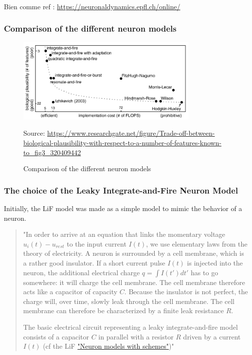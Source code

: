 \documentclass[11pt]{article}
\begin{document}
Bien comme ref : \url{https://neuronaldynamics.epfl.ch/online/}

\subsubsection{Comparison of the different neuron models}

\begin{figure}[H]
  \begin{center}
    \includegraphics[width=0.8\textwidth]{./image/comparison_neuron.png}
    \caption{Comparison of the different neuron models}
    \label{fig:comparison_neuron}
    Source: \url{https://www.researchgate.net/figure/Trade-off-between-biological-plausibility-with-respect-to-a-number-of-features-known-to_fig3_320409442}
  \end{center}
\end{figure}

\subsubsection{The choice of the Leaky Integrate-and-Fire Neuron Model}

Initially, the LiF model was made as a simple model to mimic the behavior of a neuron.
\begin{quote}
  "In order to arrive at an equation that links the momentary voltage $u_i(t) - u_{rest}$ to the input current $I(t)$, we use elementary laws from the theory of electricity. A neuron is surrounded by a cell membrane, which is a rather good insulator. If a short current pulse $I(t)$ is injected into the neuron, the additional electrical charge $q= \int I(t')dt'$ has to go somewhere: it will charge the cell membrane. The cell membrane therefore acts like a capacitor of capacity $C$. Because the insulator is not perfect, the charge will, over time, slowly leak through the cell membrane. The cell membrane can therefore be characterized by a finite leak resistance $R$.

  The basic electrical circuit representing a leaky integrate-and-fire model consists of a capacitor $C$ in parallel with a resistor $R$ driven by a current $I(t)$ (cf the LiF \hyperref[fig:comparison_neuron]{"Neuron models with schemes"})"\cite{gerstner2014neuronal}
\end{quote}
\end{document}

